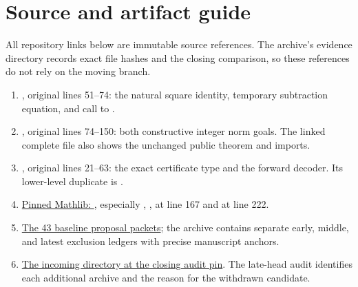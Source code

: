 \section{Source and artifact guide}
\label{sec:references}
All repository links below are immutable source references. The archive's evidence directory records exact file hashes and the closing comparison, so these references do not rely on the moving  branch.
\begin{enumerate}
\item {}, original lines 51--74: the natural square identity, temporary subtraction equation, and call to .
\item {}, original lines 74--150: both constructive integer norm goals. The linked complete file also shows the unchanged public theorem and imports.
\item {}, original lines 21--63: the exact certificate type and the forward decoder. Its lower-level duplicate is \href{https://github.com/VladimirReshetnikov/ProveIt/blob/96520cd1a5179f470b4da127bd47bc26a8d808ff/Computability/HilbertTenthProblem/Lean/Diophantine/Common/MRDPCore.lean}{}.
\item \href{https://github.com/leanprover-community/mathlib4/blob/81a5d257c8e410db227a6665ed08f64fea08e997/Mathlib/NumberTheory/PellMatiyasevic.lean}{Pinned Mathlib: }, especially , ,  at line 167 and  at line 222.
\item \href{https://github.com/VladimirReshetnikov/ProveIt/tree/96520cd1a5179f470b4da127bd47bc26a8d808ff/Computability/DiophantineConsistency/research/lean-proof-simplification}{The 43 baseline proposal packets}; the archive contains separate early, middle, and latest exclusion ledgers with precise manuscript anchors.
\item \href{https://github.com/VladimirReshetnikov/ProveIt/tree/3b51c69d42ff99bc420698532af3fe1d1f9bd356/docs/incoming}{The incoming directory at the closing audit pin}. The late-head audit identifies each additional archive and the reason for the withdrawn candidate.
\end{enumerate}

